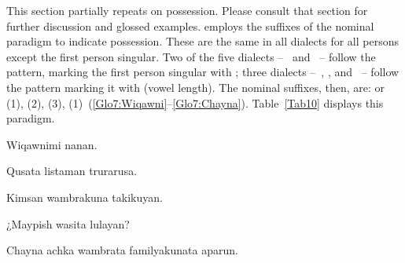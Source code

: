 This section partially repeats  on possession. Please consult that section for further discussion and glossed examples. \SYQ{} employs the suffixes of the nominal paradigm to indicate possession. These are the same in all dialects for all persons except the first person singular. Two of the five dialects --~\AMV{} and \LT~-- follow the \QII{} pattern, marking the first person singular with ; three dialects --~\ACH, \CH, and \SP~-- follow the \QI{} pattern marking it with \phono{-:} (vowel length). The \SYQ{} nominal suffixes, then, are:  or \phono{-:} (1),  (2),  (3),  (1)~(\ref{Glo7:Wiqawni}--\ref{Glo7:Chayna}). Table~\ref{Tab10} displays this paradigm.



%
{Wiqawnimi nanan.}%
{}%
{}{}%

%
{Qusa\pb{:}ta listaman trurarusa.}%
{}%
{}{}%

%
{Kimsan wambrakuna takikuyan.}%
{}%
{}{}%

%
{¿Maypish wasita lulayan?}%
{}%
{}{}%

%
{Chayna achka wambrata familyakunata aparun.}%
{}%
{}{}%

